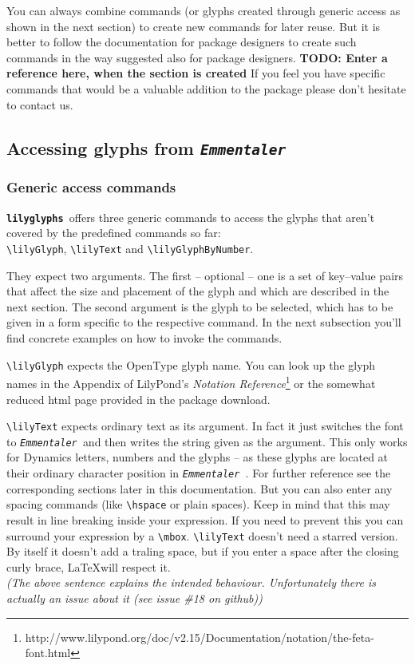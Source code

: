 \documentclass{article}
\newcommand*{\lilyglyphs}{\texttt{\textbf{lilyglyphs\,}}}
\newcommand*{\emmentaler}{\texttt{\textit{Emmentaler }}}
\newcommand*{\cmd}[1]{\texttt{\textbackslash #1}}
\begin{document}
You can always combine commands (or glyphs created through generic access as shown in the next section) to create new commands for later reuse. 
But it is better to follow the documentation for package designers to create such commands in the way suggested also for package designers.
\textbf{TODO: Enter a reference here, when the section is created}
If you feel you have specific commands that would be a valuable addition to the package please don't hesitate to contact us.



\subsection{Accessing glyphs from \emmentaler}
\subsubsection{Generic access commands}
\lilyglyphs offers three generic commands to access the glyphs that aren't covered by the predefined commands so far: \\
\cmd{lilyGlyph}, \cmd{lilyText} and \cmd{lilyGlyphByNumber}. 

They expect two arguments. 
The first -- optional -- one is a set of key--value pairs that affect the size and placement of the glyph and which are described in the next section.
The second argument is the glyph to be selected, which has to be given in a form specific to the respective command.
In the next subsection you'll find concrete examples on how to invoke the commands.

\cmd{lilyGlyph} expects the OpenType glyph name. 
You can look up the glyph names in the Appendix of LilyPond's \emph{Notation Reference}\footnote{http://www.lilypond.org/doc/v2.15/Documentation/notation/the-feta-font.html} or the somewhat reduced html page provided in the package download.

\cmd{lilyText} expects ordinary text as its argument. 
In fact it just switches the font to \emmentaler and then writes the string given as the argument. 
This only works for Dynamics letters, numbers and the glyphs  -- as these glyphs are located at their ordinary character position in \emmentaler. 
For further reference see the corresponding sections later in this documentation. 
But you can also enter any spacing commands (like \cmd{hspace} or plain spaces). 
Keep in mind that this may result in line breaking inside your expression. 
If you need to prevent this you can surround your expression by a \cmd{mbox}.
{
\color{red}
\cmd{lilyText} doesn't need a starred version. 
By itself it doesn't add a traling space, but if you enter a space after the closing curly brace, \LaTeX will respect it.\\
\textit{(The above sentence explains the intended behaviour. Unfortunately there is actually an issue about it (see issue \#18 on github))} 
}
\end{document}
